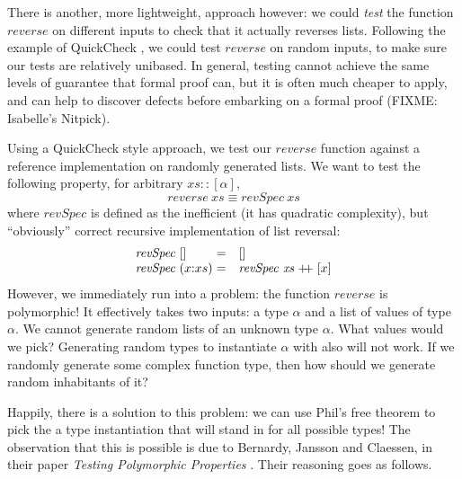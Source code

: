 \documentclass{llncs}
\newcommand{\listappend}{\mathrel{+\kern-3pt+}}
\begin{document}
There is another, more lightweight, approach however: we could
\emph{test} the function $\mathit{reverse}$ on different inputs to
check that it actually reverses lists. Following the example of
QuickCheck \cite{DBLP:conf/icfp/ClaessenH00}, we could test
$\mathit{reverse}$ on random inputs, to make sure our tests are
relatively unibased. In general, testing cannot achieve the same
levels of guarantee that formal proof can, but it is often much
cheaper to apply, and can help to discover defects before embarking on
a formal proof (FIXME: Isabelle's Nitpick).

Using a QuickCheck style approach, we test our $\mathit{reverse}$
function against a reference implementation on randomly generated
lists. We want to test the following property, for arbitrary
$\mathit{xs} :: [\alpha]$,
\begin{equation}\label{eq:reverse-test}
  \mathit{reverse}~\mathit{xs} \equiv \mathit{revSpec}~\mathit{xs}
\end{equation}
where $\mathit{revSpec}$ is defined as the inefficient (it has
quadratic complexity), but ``obviously'' correct recursive
implementation of list reversal:
\begin{displaymath}
  \begin{array}{l@{\hspace{0.3em}}l@{\hspace{0.3em}}cl}
    \mathit{revSpec}& [] & = & [] \\
    \mathit{revSpec}& (x\mathord:xs) & = & \mathit{revSpec}~\mathit{xs} \listappend [x]
  \end{array}
\end{displaymath}
However, we immediately run into a problem: the function
$\mathit{reverse}$ is polymorphic! It effectively takes two inputs: a
type $\alpha$ and a list of values of type $\alpha$. We cannot
generate random lists of an unknown type $\alpha$. What values would
we pick? Generating random types to instantiate $\alpha$ with also
will not work. If we randomly generate some complex function type,
then how should we generate random inhabitants of it?

Happily, there is a solution to this problem: we can use Phil's free
theorem to pick the a type instantiation that will stand in for all
possible types! The observation that this is possible is due to
Bernardy, Jansson and Claessen, in their paper \emph{Testing
  Polymorphic Properties} \cite{DBLP:conf/esop/BernardyJC10}. Their
reasoning goes as follows.
\end{document}
